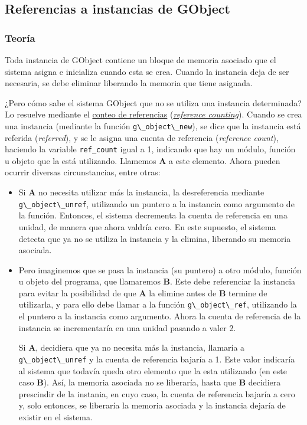 \subsection{Referencias a instancias de \textsf{GObject}} \label{subsec:ref_instancias_gobject}
\subsubsection{Teoría}
Toda instancia de \textsf{GObject} contiene un bloque de memoria asociado que el sistema asigna e inicializa cuando esta se crea.
Cuando la instancia deja de ser necesaria, se debe eliminar liberando la memoria que
tiene asignada.

¿Pero cómo sabe el sistema \textsf{GObject}  que no se utiliza una instancia determinada?
Lo resuelve mediante el
\href{https://es.wikipedia.org/wiki/Conteo_de_referencias}{conteo de referencias}
(\href{https://en.wikipedia.org/wiki/Reference_counting}{\textit{reference counting}}).
Cuando se crea una instancia (mediante la función \passthrough{\lstinline!g\_object\_new!}), se dice que la instancia está referida
(\emph{referred}), y se le asigna una cuenta de referencia (\textit{reference count}), haciendo la variable \texttt{ref\_count} igual a 1, indicando que hay un módulo, función u objeto que la está utilizando. Llamemos \textbf{A} a este elemento.
Ahora pueden ocurrir diversas circunstancias, entre otras:
\begin{itemize}
  \tightlist
\item Si \textbf{A} no necesita utilizar más la instancia, la desreferencia mediante
  \passthrough{\lstinline!g\_object\_unref!}, utilizando un puntero a la instancia como
  argumento de la función.
  Entonces, el sistema decrementa la cuenta de referencia en una unidad, de manera que
  ahora valdría cero.
  En este supuesto, el sistema detecta que ya no se utiliza la instancia y la elimina,
  liberando su memoria asociada.
\item Pero imaginemos que se pasa la instancia (su puntero) a otro módulo, función u
  objeto del programa, que llamaremos \textbf{B}. Este debe referenciar la instancia
  para evitar la posibilidad de que \textbf{A} la elimine antes de \textbf{B} termine de
  utilizarla, y para ello debe llamar a la función    \passthrough{\lstinline!g\_object\_ref!}, utilizando la el puntero a la instancia como
  argumento.
  Ahora la cuenta de referencia de la instancia se incrementaría en una unidad pasando a
  valer 2.

  Si \textbf{A}, decidiera que ya no necesita más la instancia, llamaría a
  \passthrough{\lstinline!g\_object\_unref!} y la cuenta de referencia bajaría a 1. Este
  valor indicaría al sistema que todavía queda otro elemento que la esta utilizando (en
  este caso \textbf{B}). Así, la memoria asociada no se liberaría, hasta que \textbf{B}
  decidiera prescindir de la instania, en cuyo caso, la cuenta de referencia bajaría a
  cero y, solo entonces, se liberaría la memoria asociada y la instancia dejaría de
  existir en el sistema.
\end{itemize}

